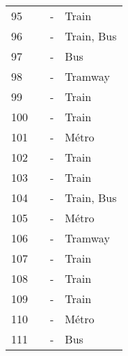 \begin{longtable}{p{0.5cm}p{5.5cm}p{3cm}p{4cm}}
    \small{95} & \small{\textcite{stransky_quartiers_2017}}\index{Stransky, Václav|pagebf} & \small{-} & \small{Train}\\
    \small{96} & \small{\textcite{stransky_periurbain_2019}}\index{Stransky, Václav|pagebf} & \small{-} & \small{Train, Bus}\\
    \small{97} & \small{\textcite{taylor_analysis_1996}}\index{Taylor, Dean|pagebf} & \small{-} & \small{Bus}\\
    \small{98} & \small{\textcite{ton_understanding_2020}}\index{Ton, Danique|pagebf} & \small{-} & \small{Tramway}\\
    \small{99} & \small{\textcite{waerden_relation_2018}}\index{Waerden, Peter|pagebf} & \small{-} & \small{Train}\\
    \small{100} & \small{\textcite{kampen_understanding_2020}}\index{van Kampen, Jullian|pagebf} & \small{-} & \small{Train}\\
   \small{101} & \small{\textcite{kampen_bicycle_2021}}\index{van Kampen, Jullian|pagebf} & \small{-} & \small{Métro}\\
    \small{102} & \small{\textcite{kampen_understanding_2021}}\index{van Kampen, Jullian|pagebf} & \small{-} & \small{Train}\\
    \small{103} & \small{\textcite{van_mil_insights_2020}}\index{van Mil, Joeri F.P.|pagebf} & \small{-} & \small{Train}\\
    \small{104} & \small{\textcite{wang_bicycle-transit_2013}}\index{Wang, Rui|pagebf} & \small{-} & \small{Train, Bus}\\
    \small{105} & \small{\textcite{wang_interchange_2016}}\index{Wang, Zi-jia|pagebf} & \small{-} & \small{Métro}\\
    \small{106} & \small{\textcite{welch_long-term_2016}}\index{Welch, Timothy F.|pagebf} & \small{-} & \small{Tramway}\\
    \small{107} & \small{\textcite{weliwitiya_factors_2017}}\index{Weliwitiya, Hesara|pagebf} & \small{-} & \small{Train}\\
    \small{108} & \small{\textcite{weliwitiya_bicycle_2019}}\index{Weliwitiya, Hesara|pagebf} & \small{-} & \small{Train}\\
    \small{109} & \small{\textcite{zhang_make_2023}}\index{Zhang, Mengyuan|pagebf} & \small{-} & \small{Train}\\
    \small{110} & \small{\textcite{zhu_improved_2021}}\index{Zhu, Zhenjun|pagebf} & \small{-} & \small{Métro}\\
    \small{111} & \small{\textcite{zuo_bikeway_2019}}\index{Zuo, Ting|pagebf} & \small{-} & \small{Bus}\\

\end{longtable}
